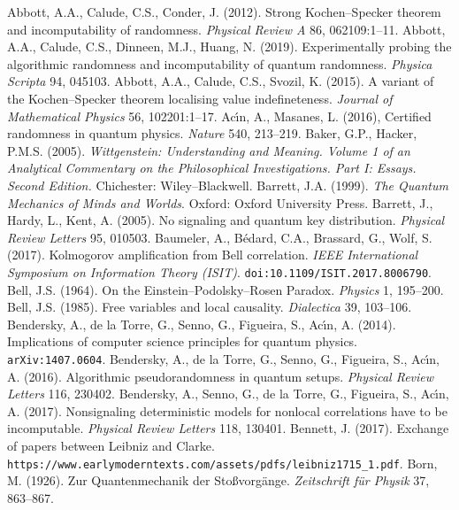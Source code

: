 \documentclass[12pt]{article}
\numberwithin{equation}{section}
\begin{document}
\begin{thebibliography}{99}
  \bibitem{}  Abbott, A.A.,  Calude, C.S.,  Conder, J.  (2012). Strong Kochen--Specker theorem 
  and incomputability of randomness. \emph{Physical Review A} 86, 062109:1--11.  
\bibitem{}  Abbott, A.A.,  Calude, C.S.,  Dinneen, M.J.,  Huang, N. (2019). 
 Experimentally probing the algorithmic randomness and incomputability of quantum randomness. \emph{Physica Scripta}
 94, 045103. 
 \bibitem{}  Abbott, A.A.,  Calude, C.S.,  Svozil, K. (2015). A variant of the Kochen--Specker theorem localising value  indefineteness. \emph{Journal of Mathematical Physics} 56, 102201:1--17.  
\bibitem{}   Ac\'{\i}n, A.,   Masanes, L. (2016), Certified randomness in quantum physics. \emph{Nature}   540,  213--219.
\bibitem{} Baker, G.P.,  Hacker, P.M.S. (2005). \emph{
Wittgenstein: Understanding and Meaning. Volume 1 of an Analytical Commentary on the Philosophical Investigations. Part I: Essays. Second Edition.} Chichester: Wiley--Blackwell. 
\bibitem{} Barrett, J.A. (1999). \emph{The Quantum Mechanics of Minds and Worlds}. Oxford: Oxford University Press. 
\bibitem{} Barrett, J.,  Hardy, L.,  Kent, A. (2005). No signaling and quantum key distribution. \emph{Physical Review Letters}
 95, 010503.
\bibitem{}    Baumeler, A.,  B\'{e}dard, C.A.,  Brassard, G.,  Wolf, S. (2017). Kolmogorov amplification from Bell correlation. 
\emph{IEEE International Symposium on Information Theory (ISIT)}. \texttt{doi:10.1109/ISIT.2017.8006790}. 
\bibitem{}
Bell, J.S. (1964). On the Einstein--Podolsky--Rosen Paradox. \emph{Physics} 1,  195--200.
\bibitem{}  Bell, J.S. (1985). Free variables and local causality. \emph{Dialectica} 39, 103--106.  
\bibitem{}   Bendersky, A.,  de la Torre, G.,  Senno, G.,  Figueira, S., Ac\'{\i}n, A. (2014). Implications of computer science principles for quantum physics. \texttt{arXiv:1407.0604}.
\bibitem{}   Bendersky, A., de la Torre, G.,  Senno, G.,   Figueira, S., Ac\'{\i}n, A. (2016).
Algorithmic pseudorandomness in quantum setups. \emph{Physical Review Letters} 116, 230402.
\bibitem{}   Bendersky, A.,   Senno, G., de la Torre, G.,  Figueira, S., Ac\'{\i}n, A. (2017).
Nonsignaling deterministic models for nonlocal correlations have to be incomputable. \emph{Physical Review Letters}
118, 130401.
\bibitem{}  Bennett, J. (2017). Exchange of papers between Leibniz and Clarke.\\
 \verb#https://www.earlymoderntexts.com/assets/pdfs/leibniz1715_1.pdf#.
 \bibitem{}  Born, M. (1926). Zur Quantenmechanik der Sto\ss vorg\"{a}nge. \emph{Zeitschrift f\"{u}r Physik}  37, 863--867. 

\end{thebibliography}
\end{document}
